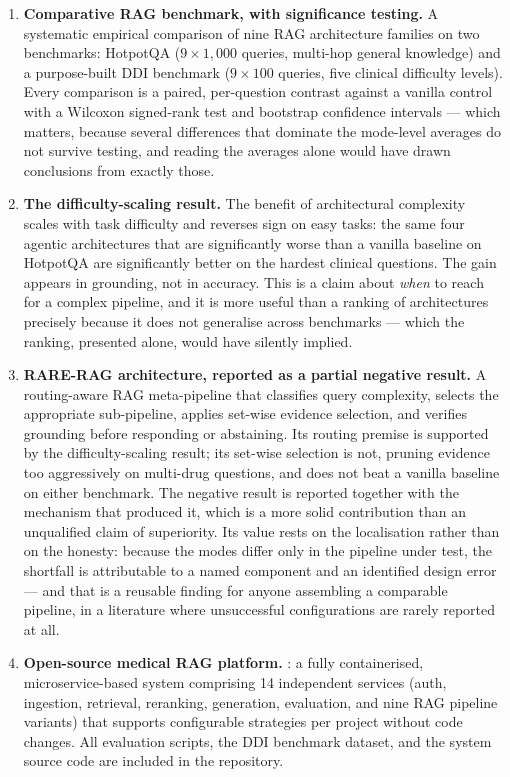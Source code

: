 \begin{enumerate}
  \item \textbf{Comparative RAG benchmark, with significance testing.}
    A systematic empirical comparison of nine RAG architecture families
    on two benchmarks: HotpotQA ($9 \times 1{,}000$ queries, multi-hop general
    knowledge) and a purpose-built DDI benchmark ($9 \times 100$ queries,
    five clinical difficulty levels).
    Every comparison is a paired, per-question contrast against a vanilla control
    with a Wilcoxon signed-rank test and bootstrap confidence intervals --- which
    matters, because several differences that dominate the mode-level averages do
    not survive testing, and reading the averages alone would have drawn
    conclusions from exactly those.

  \item \textbf{The difficulty-scaling result.}
    The benefit of architectural complexity scales with task difficulty and
    reverses sign on easy tasks: the same four agentic architectures that are
    significantly worse than a vanilla baseline on HotpotQA are significantly
    better on the hardest clinical questions.
    The gain appears in grounding, not in accuracy.
    This is a claim about \emph{when} to reach for a complex pipeline, and it is
    more useful than a ranking of architectures precisely because it does not
    generalise across benchmarks --- which the ranking, presented alone, would have
    silently implied.

  \item \textbf{RARE-RAG architecture, reported as a partial negative result.}
    A routing-aware RAG meta-pipeline that classifies query complexity, selects
    the appropriate sub-pipeline, applies set-wise evidence selection, and
    verifies grounding before responding or abstaining.
    Its routing premise is supported by the difficulty-scaling result; its
    set-wise selection is not, pruning evidence too aggressively on multi-drug
    questions, and \rarerag{} does not beat a vanilla baseline on either benchmark.
    The negative result is reported together with the mechanism that produced it,
    which is a more solid contribution than an unqualified claim of superiority.
    Its value rests on the localisation rather than on the honesty: because the
    modes differ only in the pipeline under test, the shortfall is attributable to
    a named component and an identified design error --- and
    that is a reusable finding for anyone assembling a comparable pipeline, in a
    literature where unsuccessful configurations are rarely reported at all.

  \item \textbf{Open-source medical RAG platform.}
    \medrag{}: a fully containerised, microservice-based system comprising
    14 independent services (auth, ingestion, retrieval, reranking, generation,
    evaluation, and nine RAG pipeline variants) that supports configurable
    strategies per project without code changes.
    All evaluation scripts, the DDI benchmark dataset, and the system source
    code are included in the repository.
\end{enumerate}

